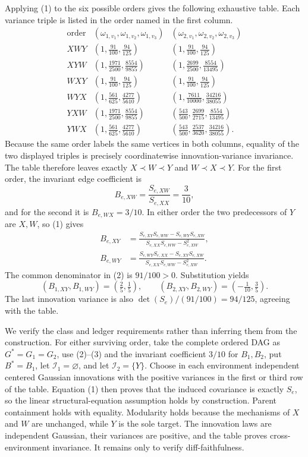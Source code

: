Applying (1) to the six possible orders gives the following exhaustive table. Each variance triple is listed in the order named in the first column.
\[
\begin{array}{c|c|c}
 \text{order}&(\omega_{1,v_1},\omega_{1,v_2},\omega_{1,v_3})
             &(\omega_{2,v_1},\omega_{2,v_2},\omega_{2,v_3})\\ \hline
 XWY&(1,\frac{91}{100},\frac{94}{125})
     &(1,\frac{91}{100},\frac{94}{125})\\
 XYW&(1,\frac{1971}{2500},\frac{8554}{9855})
     &(1,\frac{2699}{2500},\frac{8554}{13495})\\
 WXY&(1,\frac{91}{100},\frac{94}{125})
     &(1,\frac{91}{100},\frac{94}{125})\\
 WYX&(1,\frac{561}{625},\frac{4277}{5610})
     &(1,\frac{7611}{10000},\frac{34216}{38055})\\
 YXW&(1,\frac{1971}{2500},\frac{8554}{9855})
     &(\frac{543}{500},\frac{2699}{2715},\frac{8554}{13495})\\
 YWX&(1,\frac{561}{625},\frac{4277}{5610})
     &(\frac{543}{500},\frac{2537}{3620},\frac{34216}{38055}).
\end{array}
\]
Because the same order labels the same vertices in both columns, equality of the two displayed triples is precisely coordinatewise innovation-variance invariance. The table therefore leaves exactly \(X\prec W\prec Y\) and \(W\prec X\prec Y\). For the first order, the invariant edge coefficient is
\[
 B_{e,XW}=\frac{S_{e,XW}}{S_{e,XX}}=\frac3{10},
\]
and for the second it is \(B_{e,WX}=3/10\). In either order the two predecessors of \(Y\) are \(X,W\), so (1) gives
\[
\begin{split}
 B_{e,XY}
 &=\frac{S_{e,XY}S_{e,WW}-S_{e,WY}S_{e,XW}}
         {S_{e,XX}S_{e,WW}-S_{e,XW}^2},\\
 B_{e,WY}
 &=\frac{S_{e,WY}S_{e,XX}-S_{e,XY}S_{e,XW}}
         {S_{e,XX}S_{e,WW}-S_{e,XW}^2}.
\end{split}
\tag{2}
\]
The common denominator in (2) is \(91/100>0\). Substitution yields
\[
 (B_{1,XY},B_{1,WY})=(\tfrac25,\tfrac15),
 \qquad
 (B_{2,XY},B_{2,WY})=(-\tfrac1{10},\tfrac35).
 \tag{3}
\]
The last innovation variance is also \(\det(S_e)/(91/100)=94/125\), agreeing with the table.

We verify the class and ledger requirements rather than inferring them from the construction. For either surviving order, take the complete ordered DAG as \(G^*=G_1=G_2\), use (2)--(3) and the invariant coefficient \(3/10\) for \(B_1,B_2\), put \(B^*=B_1\), let \(\mathcal I_1=\varnothing\), and let \(\mathcal I_2=\{Y\}\). Choose in each environment independent centered Gaussian innovations with the positive variances in the first or third row of the table. Equation (1) then proves that the induced covariance is exactly \(S_e\), so the linear structural-equation assumption holds by construction. Parent containment holds with equality. Modularity holds because the mechanisms of \(X\) and \(W\) are unchanged, while \(Y\) is the sole target. The innovation laws are independent Gaussian, their variances are positive, and the table proves cross-environment invariance. It remains only to verify diff-faithfulness.

